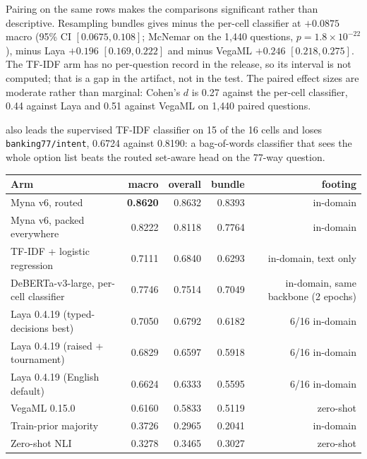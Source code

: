 Pairing on the same rows makes the comparisons significant rather than descriptive. Resampling
bundles gives \vsix{} minus the per-cell classifier at $+0.0875$ macro (95\% CI $[0.0675,0.108]$;
McNemar on the 1{,}440 questions, $p=1.8\times10^{-22}$), minus Laya $+0.196$ $[0.169,0.222]$ and
minus VegaML $+0.246$ $[0.218,0.275]$. The TF-IDF arm has no per-question record in the release, so
its interval is not computed; that is a gap in the artifact, not in the test. The paired effect
sizes are moderate rather than marginal: Cohen's $d$ is 0.27 against the per-cell classifier, 0.44
against Laya and 0.51 against VegaML on 1{,}440 paired questions.

\vsix{} also leads the supervised TF-IDF classifier on 15 of the 16 cells and loses
\texttt{banking77/intent}, 0.6724 against 0.8190: a bag-of-words classifier that sees the whole
option list beats the routed set-aware head on the 77-way question.

\begin{widetable}
\centering
\footnotesize
\caption{All arms on the same 1{,}176 bundles and 1{,}440 questions. Macro is the unweighted mean
over the 16 cells; bundle exact is the fraction of bundles in which every question is correct.
Laya is in-domain on 6 of 16 cells and zero-shot on 10; VegaML is zero-shot on all 16; \vsix{} is
in-domain on all 16. The two \myna{} rows differ only in the routing switch.}
\label{tab:main}
\begin{tabular}{lrrrr}
\toprule
Arm & macro & overall & bundle & footing \\
\midrule
Myna v6, routed & \textbf{0.8620} & 0.8632 & 0.8393 & in-domain \\
Myna v6, packed everywhere & 0.8222 & 0.8118 & 0.7764 & in-domain \\
TF-IDF + logistic regression & 0.7111 & 0.6840 & 0.6293 & in-domain, text only \\
DeBERTa-v3-large, per-cell classifier & 0.7746 & 0.7514 & 0.7049 & in-domain, same backbone (2 epochs) \\
Laya 0.4.19 (typed-decisions best) & 0.7050 & 0.6792 & 0.6182 & 6/16 in-domain \\
Laya 0.4.19 (raised + tournament) & 0.6829 & 0.6597 & 0.5918 & 6/16 in-domain \\
Laya 0.4.19 (English default) & 0.6624 & 0.6333 & 0.5595 & 6/16 in-domain \\
VegaML 0.15.0 & 0.6160 & 0.5833 & 0.5119 & zero-shot \\
Train-prior majority & 0.3726 & 0.2965 & 0.2041 & in-domain \\
Zero-shot NLI & 0.3278 & 0.3465 & 0.3027 & zero-shot \\
\bottomrule
\end{tabular}
\end{widetable}


